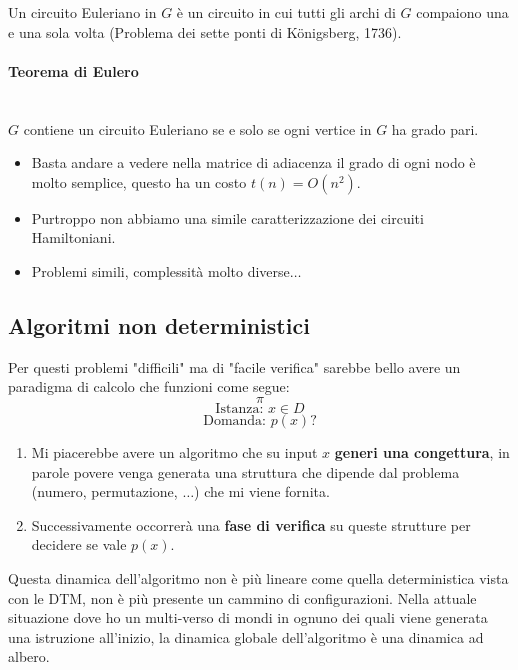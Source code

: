 \documentclass{article}
\begin{document}
Un circuito Euleriano in $G$ è un circuito in cui tutti gli archi di $G$ compaiono una e una
sola volta (Problema dei sette ponti di Königsberg, 1736).
\paragraph{Teorema di Eulero}\mbox{}\\
$G$ contiene un circuito Euleriano se e solo se ogni vertice in $G$ ha grado pari.

\begin{itemize}
    \item Basta andare a vedere nella matrice di adiacenza il grado di ogni nodo è
          molto semplice, questo ha un costo $t(n)=O(n^2)$.
    \item Purtroppo non abbiamo una simile caratterizzazione dei circuiti Hamiltoniani.
    \item Problemi simili, complessità molto diverse$\dots$
\end{itemize}

\subsection{Algoritmi non deterministici}
Per questi problemi "difficili" ma di "facile verifica" sarebbe bello avere un paradigma di
calcolo che funzioni come segue:
$$\pi$$
$$\text{Istanza: }x\in D$$
$$\text{Domanda: }p(x)?$$


\begin{enumerate}
    \item Mi piacerebbe avere un algoritmo che su input $x$ \textbf{generi una congettura}, in parole
          povere venga generata una struttura che dipende dal problema (numero, permutazione, $\dots$)
          che mi viene fornita.

    \item Successivamente occorrerà una \textbf{fase di verifica} su queste strutture per decidere se
          vale $p(x)$.
\end{enumerate}
Questa dinamica dell'algoritmo non è più lineare come quella deterministica vista
con le DTM, non è più presente un cammino di configurazioni. Nella attuale situazione
dove ho un multi-verso di mondi in ognuno dei quali viene generata una istruzione
all'inizio, la dinamica globale dell'algoritmo è una dinamica ad albero.
\end{document}
